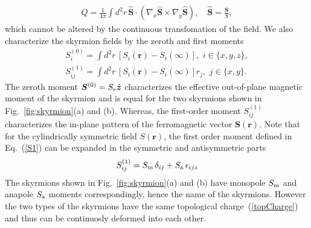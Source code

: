 \documentclass[twocolumn,showpacs,floatfix,nofootinbib,longbibliography]{revtex4-1}
\begin{document}
\begin{align}
	Q = \frac{1}{4\pi} \int d^2r \, \hat {\bm S}\cdot (\nabla_x\hat {\bm S}\times\nabla_y\hat {\bm S}), \quad \hat {\bm S}= \frac{\bm S}{S}, 
	\label{topCharge}
\end{align}
which cannot be altered by the continuous transfomation of the field.  We also characterize the skyrmion fields by the zeroth and first moments
\begin{align}
	S^{(0)}_i = \int  d^2r \, \left[S_i(\bm r)-S_i(\infty)\right],\,\, i\in \{x,y,z\}, \label{S0} \\
	S^{(1)}_{ij} = \int  d^2r \, \left[S_i(\bm r)-S_i(\infty)\right] r_j,\,\, j\in \{x,y\}. \label{S1}
\end{align}
The zeroth moment $\bm S^{(0)} = S_{\rm e} \hat{\bm z}$ characterizes the effective out-of-plane magnetic moment of the skyrmion and is equal for the two skyrmions shown in Fig.~{\ref{fig:skyrmion}}(a) and (b). Whereas, the first-order moment $S^{(1)}_{ij}$ characterizes the in-plane pattern of the ferromagnetic vector $\bm S(\bm r)$. Note that for the cylindrically symmetric field $S(\bm r)$, the first order moment defined in Eq.~(\ref{S1}) can be expanded in the symmetric and antisymmetric parts 
\begin{equation}
	S^{(1)}_{ij}=S_{\rm m}\,\delta_{ij} + S_{\rm a}\,\epsilon_{ijz}
\end{equation}	
The skyrmions shown in Fig.~\ref{fig:skyrmion}(a) and (b) have monopole $S_{\rm m}$ and anapole $S_{\rm a}$ moments correspondingly, hence the name of the skyrmions. However the two types of the skyrmions have the same topological charge~(\ref{topCharge}) and thus can be continuosly deformed into each other. 
\end{document}
